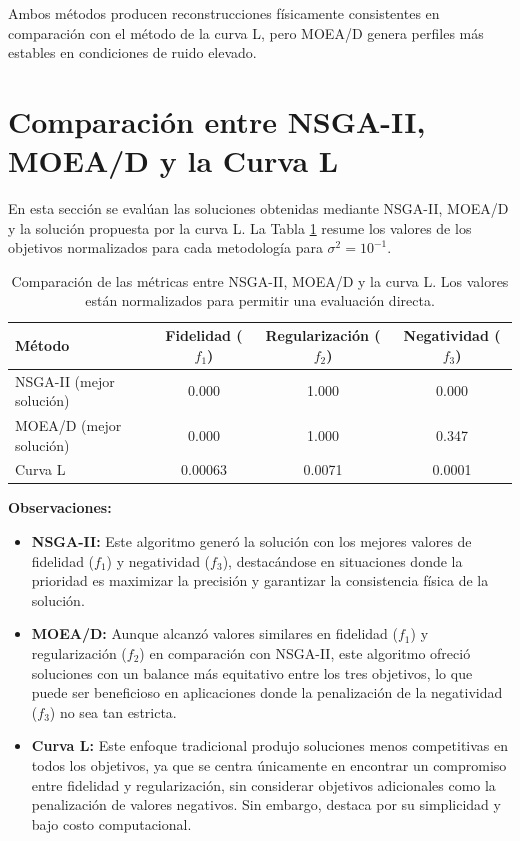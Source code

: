 Ambos métodos producen reconstrucciones físicamente consistentes en comparación con el método de la curva L, pero MOEA/D genera perfiles más estables en condiciones de ruido elevado.

\section{Comparación entre NSGA-II, MOEA/D y la Curva L} \label{sec:results:comparison}

En esta sección se evalúan las soluciones obtenidas mediante NSGA-II, MOEA/D y la solución propuesta por la curva L. La Tabla \ref{tab:comparison_algorithms} resume los valores de los objetivos normalizados para cada metodología para \( \sigma^2 = 10^{-1} \).

\begin{table}[h]
    \centering
    \begin{tabular}{lccc}
        \toprule
        \textbf{Método} & \textbf{Fidelidad (\( f_1 \))} & \textbf{Regularización (\( f_2 \))} & \textbf{Negatividad (\( f_3 \))} \\
        \midrule
        NSGA-II (mejor solución) & 0.000 & 1.000 & 0.000 \\
        MOEA/D (mejor solución) & 0.000 & 1.000 & 0.347 \\
        Curva L & 0.00063 & 0.0071 & 0.0001 \\
        \bottomrule
    \end{tabular}
    \caption{Comparación de las métricas entre NSGA-II, MOEA/D y la curva L. Los valores están normalizados para permitir una evaluación directa.}
    \label{tab:comparison_algorithms}
\end{table}

\noindent
\textbf{Observaciones:}
\begin{itemize}
    \item \textbf{NSGA-II:} Este algoritmo generó la solución con los mejores valores de fidelidad (\( f_1 \)) y negatividad (\( f_3 \)), destacándose en situaciones donde la prioridad es maximizar la precisión y garantizar la consistencia física de la solución.
    \item \textbf{MOEA/D:} Aunque alcanzó valores similares en fidelidad (\( f_1 \)) y regularización (\( f_2 \)) en comparación con NSGA-II, este algoritmo ofreció soluciones con un balance más equitativo entre los tres objetivos, lo que puede ser beneficioso en aplicaciones donde la penalización de la negatividad (\( f_3 \)) no sea tan estricta.
    \item \textbf{Curva L:} Este enfoque tradicional produjo soluciones menos competitivas en todos los objetivos, ya que se centra únicamente en encontrar un compromiso entre fidelidad y regularización, sin considerar objetivos adicionales como la penalización de valores negativos. Sin embargo, destaca por su simplicidad y bajo costo computacional.
\end{itemize}

